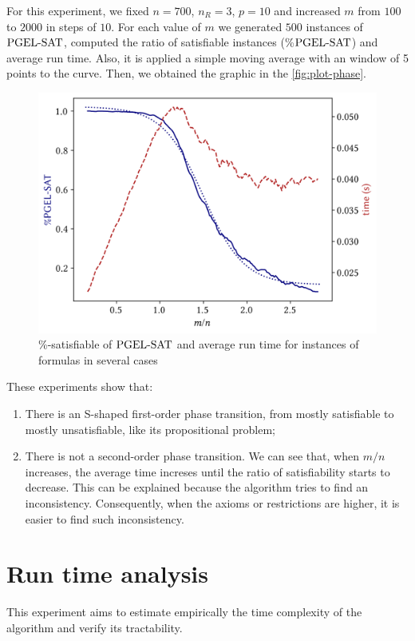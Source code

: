 For this experiment, we fixed $n = 700$, $n_R = 3$, $p = 10$ and increased $m$ from $100$ to $2000$ in steps of $10$. For each value of $m$ we generated $500$ instances of $\text{PGEL-SAT}$, computed the ratio of satisfiable instances (\%$\text{PGEL-SAT}$) and average run time. Also, it is applied a simple moving average with an window of 5 points to the curve.  Then, we obtained the graphic in the \autoref{fig:plot-phase}.

\begin{figure}[ht]
  \centering
  \includegraphics[width=.75\textwidth]{../img/plot-phase-trans}
  \caption{\%-satisfiable of $\text{PGEL-SAT}$ and average run time for instances of formulas in several cases}
  \label{fig:plot-phase}
\end{figure}
  

These experiments show that:
\begin{enumerate}[label=(\alph*)]
	\item There is an S-shaped first-order phase transition, from mostly satisfiable to mostly unsatisfiable, like its propositional problem;
	\item There is not a second-order phase transition. We can see that, when $m/n$ increases, the average time increses until the ratio of satisfiability starts to decrease. This can be explained because the algorithm tries to find an inconsistency. Consequently, when the axioms or restrictions are higher, it is easier to find such inconsistency. 
\end{enumerate}

\section{Run time analysis}

This experiment aims to estimate empirically the time complexity of the algorithm and verify its tractability.

